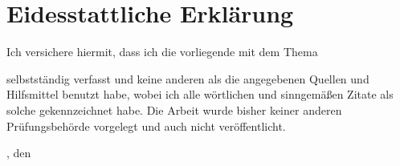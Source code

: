 \chapter*{Eidesstattliche Erklärung} %

Ich versichere hiermit, dass ich die vorliegende {\subjectDocument} mit dem Thema
\begin{quote}
	\textit{\titleDocument}
\end{quote}
selbstständig verfasst und keine anderen als die angegebenen Quellen und Hilfsmittel benutzt habe, wobei ich alle wörtlichen und sinngemäßen Zitate als solche gekennzeichnet habe.
Die Arbeit wurde bisher keiner anderen Prüfungsbehörde vorgelegt und auch nicht veröffentlicht.

\vspace*{2cm}

\begingroup
	\setlength{\parindent}{0pt} %
	
	\locationDocument, den \dateDocument
	\bigskip
	\bigskip
	
	\newlength{\widthbox}
	\settowidth{\widthbox}{\locationDocument, den }
	\makebox[\widthbox]{\hrulefill}\\
	\authorDocument
\endgroup
